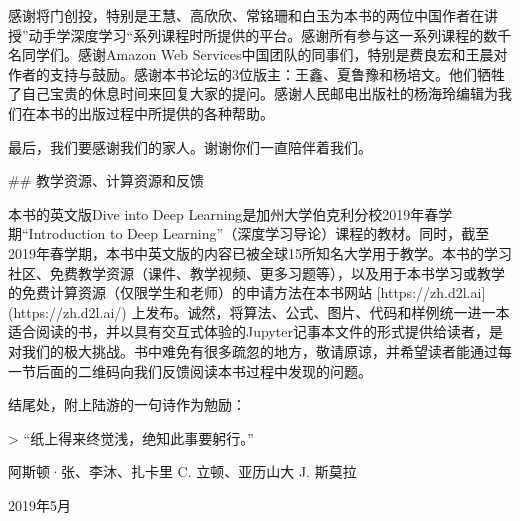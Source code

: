 感谢将门创投，特别是王慧、高欣欣、常铭珊和白玉为本书的两位中国作者在讲授”动手学深度学习“系列课程时所提供的平台。感谢所有参与这一系列课程的数千名同学们。感谢Amazon Web Services中国团队的同事们，特别是费良宏和王晨对作者的支持与鼓励。感谢本书论坛的3位版主：王鑫、夏鲁豫和杨培文。他们牺牲了自己宝贵的休息时间来回复大家的提问。感谢人民邮电出版社的杨海玲编辑为我们在本书的出版过程中所提供的各种帮助。

最后，我们要感谢我们的家人。谢谢你们一直陪伴着我们。

## 教学资源、计算资源和反馈

本书的英文版Dive into Deep Learning是加州大学伯克利分校2019年春学期“Introduction to Deep Learning”（深度学习导论）课程的教材。同时，截至2019年春学期，本书中英文版的内容已被全球15所知名大学用于教学。本书的学习社区、免费教学资源（课件、教学视频、更多习题等），以及用于本书学习或教学的免费计算资源（仅限学生和老师）的申请方法在本书网站 [https://zh.d2l.ai](https://zh.d2l.ai/) 上发布。诚然，将算法、公式、图片、代码和样例统一进一本适合阅读的书，并以具有交互式体验的Jupyter记事本文件的形式提供给读者，是对我们的极大挑战。书中难免有很多疏忽的地方，敬请原谅，并希望读者能通过每一节后面的二维码向我们反馈阅读本书过程中发现的问题。

结尾处，附上陆游的一句诗作为勉励：

> “纸上得来终觉浅，绝知此事要躬行。”

阿斯顿·张、李沐、扎卡里 C. 立顿、亚历山大 J. 斯莫拉

2019年5月
